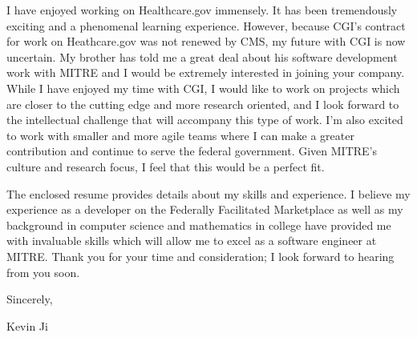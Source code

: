\documentclass[10pt, letterpaper]{letter}
\begin{document}
I have enjoyed working on Healthcare.gov immensely. It has been tremendously exciting and a phenomenal learning experience. However, because CGI's contract for work on Heathcare.gov was not renewed by CMS, my future with CGI is now uncertain. My brother has told me a great deal about his software development work with MITRE and I would be extremely interested in joining your company. While I have enjoyed my time with CGI, I would like to work on projects which are closer to the cutting edge and more research oriented, and I look forward to the intellectual challenge that will accompany this type of work. I'm also excited to work with smaller and more agile teams where I can make a greater contribution and continue to serve the federal government. Given MITRE's culture and research focus, I feel that this would be a perfect fit. 

The enclosed resume provides details about my skills and experience. I believe my experience as a developer on the Federally Facilitated Marketplace as well as my background in computer science and mathematics in college have provided me with invaluable skills which will allow me to excel as a software engineer at MITRE. Thank you for your time and consideration; I look forward to hearing from you soon. 

Sincerely,

Kevin Ji
\end{document}
